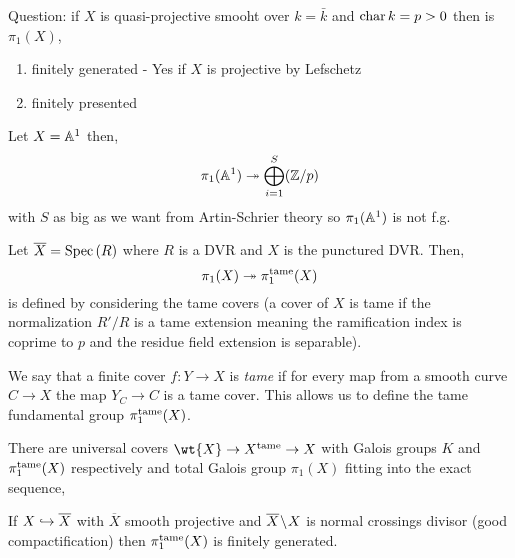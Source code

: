 \documentclass[12pt]{article}
\begin{document}
\begin{rmk}
Question: if $X$ is quasi-projective smooht over $k = \bar{k}$ and $\operatorname{\mathrm{char}}{k} = p > 0$ then is $\pi_1(X)$,
\begin{enumerate}
\item finitely generated - Yes if $X$ is projective by Lefschetz 
\item finitely presented 
\end{enumerate}
\end{rmk}

\begin{example}
Let $X = \mathbb{A}^1$ then,
\[ \pi_1(\mathbb{A}^1) \twoheadrightarrow \bigoplus_{i = 1}^S (\mathbb{Z} / p) \]
with $S$ as big as we want from Artin-Schrier theory so $\pi_1(\mathbb{A}^1)$ is not f.g.
\end{example}

\begin{defn}
Let $\overline{X} = \mathrm{Spec}\left( R \right)$ where $R$ is a DVR and $X$ is the punctured DVR. Then,
\[ \pi_1(X) \twoheadrightarrow \pi_1^{\mathrm{tame}}(X) \]
is defined by considering the tame covers (a cover of $X$ is tame if the normalization $R' / R$ is a tame extension meaning the ramification index is coprime to $p$ and the residue field extension is separable). 
\end{defn}

\begin{defn}
We say that a finite \etale cover $f : Y \to X$ is \textit{tame} if for every map from a smooth curve $C \to X$ the map $Y_C \to C$ is a tame \etale cover. This allows us to define the tame fundamental group $\pi_1^{\mathrm{tame}}(X)$. 
\end{defn}

\begin{rmk}
There are universal covers $\wt{X} \to X^{\tame} \to X$ with Galois groups $K$ and $\pi_1^{\mathrm{tame}}(X)$ respectively and total Galois group $\pi_1(X)$ fitting into the exact sequence,
\begin{center}
\end{center}
\end{rmk}

\begin{lemma}
If $X \hookrightarrow \overline{X}$ with $\overline{X}$ smooth projective and $\overline{X} \! \setminus \! X$ is normal crossings divisor (good compactification) then $\pi_1^{\mathrm{tame}}(X)$ is finitely generated.
\end{lemma}
\end{document}
